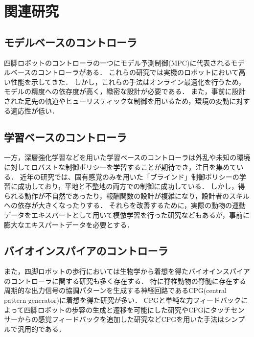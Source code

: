 \section{関連研究}
\subsection{モデルベースのコントローラ}
四脚ロボットのコントローラの一つにモデル予測制御(MPC)\cite{MIT_Cheetah_3,kim2019highly,sombolestan2021adaptive}に代表されるモデルベースのコントローラがある．
これらの研究では実機のロボットにおいて高い性能を示してきた．
しかし，これらの手法はオンライン最適化を行うため，モデルの精度への依存度が高く，緻密な設計が必要である．
また，事前に設計された足先の軌道やヒューリスティックな制御を用いるため，環境の変動に対する適応性が低い．
\subsection{学習ベースのコントローラ}
一方，深層強化学習などを用いた学習ベースのコントローラは外乱や未知の環境に対してロバストな制御ポリシーを学習することが期待でき，注目を集めている．
近年の研究では、固有感覚のみを用いた「ブラインド」制御ポリシーの学習に成功しており，平地\cite{tan2018simtoreal,Hwangbo_2019}と不整地\cite{kumar2021rma,challenging_terrain,margolis2022walkwaystuningrobot}の両方での制御に成功している．
しかし，得られる動作が不自然であったり，報酬関数の設計が複雑になり，設計者のスキルへの依存が大きくなったりする．
それらを改善するために，実際の動物の運動データをエキスパートとして用いて模倣学習を行った研究\cite{RoboImitationPeng20}などもあるが，事前に膨大なエキスパートデータを必要とする．
\subsection{バイオインスパイアのコントローラ}
また，四脚ロボットの歩行においては生物学から着想を得たバイオインスパイアのコントローラに関する研究も多く存在する．
特に脊椎動物の脊髄に存在する周期的な出力信号の協調パターンを生成する神経回路であるCPG(central pattern generator)に着想を得た研究が多い．
CPGと単純な力フィードバックによって四脚ロボットの歩容の生成と遷移を可能にした研究\cite{Owaki1,Owaki2}やCPGにタッチセンサーからの感覚フィードバックを追加した研究\cite{4543306}などCPGを用いた手法はシンプルで汎用的である．